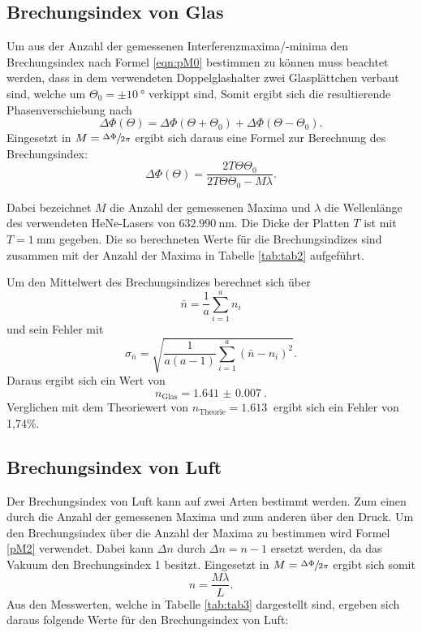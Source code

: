 \subsection{Brechungsindex von Glas}

Um aus der Anzahl der gemessenen Interferenzmaxima/-minima den Brechungsindex nach Formel \ref{eqn:pM0}
bestimmen zu können muss beachtet werden, dass in dem verwendeten Doppelglashalter zwei Glasplättchen verbaut sind,
welche um $\Theta_0=\pm\SI{10}{\degree}$ verkippt sind. Somit ergibt sich die resultierende
Phasenverschiebung nach
\begin{equation}
  \Delta\Phi(\Theta)=\Delta\Phi(\Theta+\Theta_0)+\Delta\Phi(\Theta-\Theta_0).
\end{equation}
Eingesetzt in $M=\sfrac{\Delta\Phi}{2\pi}$ ergibt sich daraus eine Formel zur Berechnung des Brechungsindex:
\begin{equation}
  \Delta\Phi(\Theta)=\frac{2T\Theta\Theta_0}{2T\Theta\Theta_0-M\lambda}.
\end{equation}

Dabei bezeichnet $M$ die Anzahl der gemessenen Maxima und $\lambda$ die Wellenlänge des
verwendeten HeNe-Lasers von $\SI{632,990}{\nm}$. Die Dicke der Platten $T$ ist mit
$T=\SI{1}{\mm}$ gegeben. Die so berechneten Werte für die Brechungsindizes sind zusammen mit
der Anzahl der Maxima in Tabelle \ref{tab:tab2} aufgeführt.



Um den Mittelwert des Brechungsindizes berechnet sich über
\begin{equation}
  \bar{n}=\frac{1}{a}\sum_{i=1}^{a}n_i
  \label{eqn:Mittel}
\end{equation}
und sein Fehler mit
\begin{equation}
  \sigma_{\bar{n}}=\sqrt{\frac{1}{a(a-1)}\sum_{i=1}^{a}(\bar{n}-n_i)^2}.
  \label{eqn:Fehler}
\end{equation}
Daraus ergibt sich ein Wert von
\begin{equation}
  n_\text{Glas}=\SI{1.641(7)}{}.
\end{equation}
Verglichen mit dem Theoriewert von $n_\text{Theorie}=\SI{1,613}{}$ ergibt sich ein Fehler von 1,74\%.

\subsection{Brechungsindex von Luft}

Der Brechungsindex von Luft kann auf zwei Arten bestimmt werden. Zum einen durch die Anzahl der
gemessenen Maxima und zum anderen über den Druck.
Um den Brechungsindex über die Anzahl der Maxima zu bestimmen wird Formel \ref{pM2}
verwendet. Dabei kann $\Delta n$ durch  $\Delta n= n-1$ ersetzt werden, da das Vakuum den
Brechungsindex 1 besitzt. Eingesetzt in $M=\sfrac{\Delta\Phi}{2\pi}$ ergibt sich somit
\begin{equation}
  n=\frac{M\lambda}{L}.
\end{equation}
Aus den Messwerten, welche in Tabelle \ref{tab:tab3} dargestellt sind, ergeben sich daraus folgende Werte für
den Brechungsindex von Luft:

